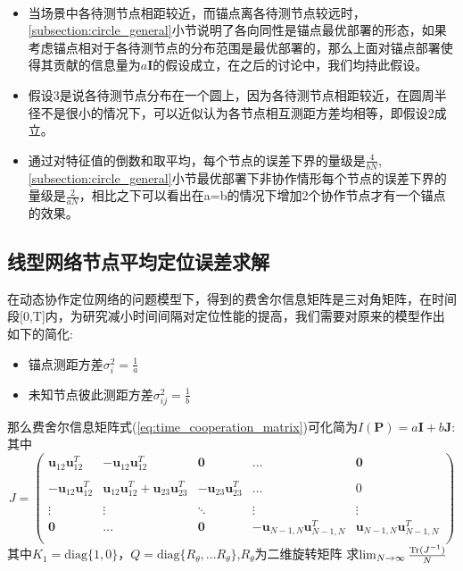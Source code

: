 \begin{remark}
~\\
\begin{itemize}
  \item 当场景中各待测节点相距较近，而锚点离各待测节点较远时，\ref{subsection:circle_general}小节说明了各向同性是锚点最优部署的形态，如果考虑锚点相对于各待测节点的分布范围是最优部署的，那么上面对锚点部署使得其贡献的信息量为$a\bm{I}$的假设成立，在之后的讨论中，我们均持此假设。
  \item 假设3是说各待测节点分布在一个圆上，因为各待测节点相距较近，在圆周半径不是很小的情况下，可以近似认为各节点相互测距方差均相等，即假设2成立。
  \item 通过对特征值的倒数和取平均，每个节点的误差下界的量级是$\frac{4}{bN}$,\ref{subsection:circle_general}小节最优部署下非协作情形每个节点的误差下界的量级是$\frac{2}{aN}$，相比之下可以看出在a=b的情况下增加2个协作节点才有一个锚点的效果。
\end{itemize}

\end{remark}
\subsection{线型网络节点平均定位误差求解}\label{subsection:linear_network}
在动态协作定位网络的问题模型下，得到的费舍尔信息矩阵是三对角矩阵，在时间段[0,T]内，为研究减小时间间隔对定位性能的提高，我们需要对原来的模型作出如下的简化:
\begin{itemize}
\item 锚点测距方差$\sigma_i^2=\frac{1}{a}$
\item 未知节点彼此测距方差$\sigma^2_{ij}=\frac{1}{b}$
\end{itemize}
那么费舍尔信息矩阵式(\ref{eq:time_cooperation_matrix})可化简为$I(\bm{P})=a\bm{I}+b\bm{J}$:
其中\[
J=\left(
\begin{array}{ccccc}
\bm{u}_{12}\bm{u}_{12}^T&-\bm{u}_{12}\bm{u}_{12}^T&\bm{0}&\dots&\bm{0}\\
&&&&\\
-\bm{u}_{12}\bm{u}_{12}^T&\bm{u}_{12}\bm{u}_{12}^T+\bm{u}_{23}\bm{u}_{23}^T&-\bm{u}_{23}\bm{u}_{23}^T&\dots&0\\
&&&&\\
\vdots &\vdots&\ddots &\vdots&\vdots\\
\bm{0}&\dots&\bm{0}&-\bm{u}_{N-1,N}\bm{u}_{N-1,N}^T&\bm{u}_{N-1,N}\bm{u}_{N-1,N}^T\\
\end{array}
\right)
\]
其中$K_1=\text{diag}\{1,0\}$，$Q=\text{diag}\{R_{\theta},...R_{\theta}\}$,$R_{\theta}$为二维旋转矩阵
求$\lim_{N\to \infty}\frac{\operatorname{Tr}(J^{-1})}{N}$


